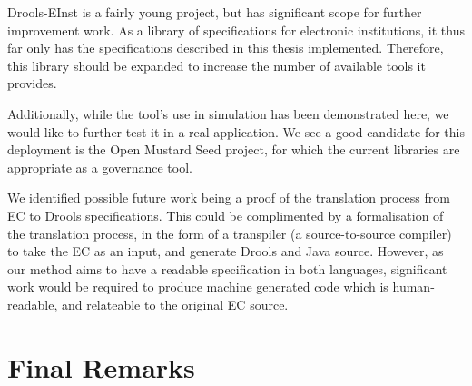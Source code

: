 Drools-EInst is a fairly young project, but has significant scope for further
improvement work. As a library of specifications for electronic institutions,
it thus far only has the specifications described in this thesis implemented.
Therefore, this library should be expanded to increase the number of available
tools it provides.

Additionally, while the tool's use in simulation has been demonstrated here,
we would like to further test it in a real application. We see a good candidate for
this deployment is the Open Mustard Seed project, for which the current
libraries are appropriate as a governance tool.

We identified possible future work being a proof of the translation process
from \ac{EC} to Drools specifications. This could be complimented by a
formalisation of the translation process, in the form of a transpiler (a
source-to-source compiler) to take the \ac{EC} as an input, and generate
Drools and Java source. However, as our method aims to have a readable
specification in both languages, significant work would be required to produce
machine generated code which is human-readable, and relateable to the original
\ac{EC} source.

\section{Final Remarks}
